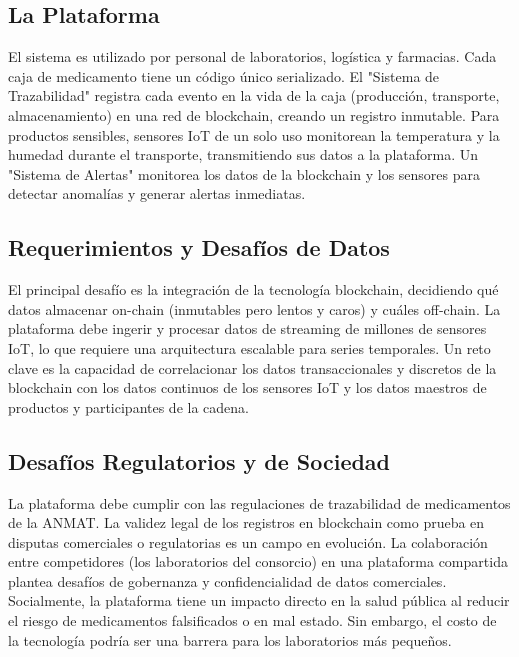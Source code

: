 \documentclass[12pt]{article}
\begin{document}
\subsection{La Plataforma}
El sistema es utilizado por personal de laboratorios, logística y farmacias. Cada caja de medicamento tiene un código único serializado. El "Sistema de Trazabilidad" registra cada evento en la vida de la caja (producción, transporte, almacenamiento) en una red de blockchain, creando un registro inmutable. Para productos sensibles, sensores IoT de un solo uso monitorean la temperatura y la humedad durante el transporte, transmitiendo sus datos a la plataforma. Un "Sistema de Alertas" monitorea los datos de la blockchain y los sensores para detectar anomalías y generar alertas inmediatas.

\subsection{Requerimientos y Desafíos de Datos}
El principal desafío es la integración de la tecnología blockchain, decidiendo qué datos almacenar on-chain (inmutables pero lentos y caros) y cuáles off-chain. La plataforma debe ingerir y procesar datos de streaming de millones de sensores IoT, lo que requiere una arquitectura escalable para series temporales. Un reto clave es la capacidad de correlacionar los datos transaccionales y discretos de la blockchain con los datos continuos de los sensores IoT y los datos maestros de productos y participantes de la cadena.

\subsection{Desafíos Regulatorios y de Sociedad}
La plataforma debe cumplir con las regulaciones de trazabilidad de medicamentos de la ANMAT. La validez legal de los registros en blockchain como prueba en disputas comerciales o regulatorias es un campo en evolución. La colaboración entre competidores (los laboratorios del consorcio) en una plataforma compartida plantea desafíos de gobernanza y confidencialidad de datos comerciales. Socialmente, la plataforma tiene un impacto directo en la salud pública al reducir el riesgo de medicamentos falsificados o en mal estado. Sin embargo, el costo de la tecnología podría ser una barrera para los laboratorios más pequeños.
\end{document}
